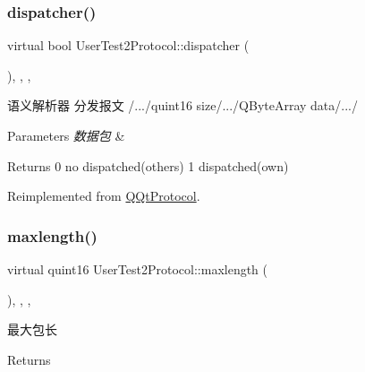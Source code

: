 \subsubsection{\texorpdfstring{dispatcher()}{dispatcher()}}
{\footnotesize\ttfamily virtual bool User\+Test2\+Protocol\+::dispatcher (\begin{DoxyParamCaption}\item[{const Q\+Byte\+Array \&}]{ }\end{DoxyParamCaption})\hspace{0.3cm}{\ttfamily [inline]}, {\ttfamily [override]}, {\ttfamily [protected]}, {\ttfamily [virtual]}}



语义解析器 分发报文 /.../quint16 size/.../\+Q\+Byte\+Array data/.../ 


\begin{DoxyParams}{Parameters}
{\em 数据包} & \\
\hline
\end{DoxyParams}
\begin{DoxyReturn}{Returns}
0 no dispatched(others) 1 dispatched(own) 
\end{DoxyReturn}


Reimplemented from \mbox{\hyperlink{class_q_qt_protocol_a35a69c4b89c8cf7459038f40d75e0dc9}{Q\+Qt\+Protocol}}.

\mbox{\label{class_user_test2_protocol_ace8c98d761f9660ad1d602c672e16705}} 
\subsubsection{\texorpdfstring{maxlength()}{maxlength()}}
{\footnotesize\ttfamily virtual quint16 User\+Test2\+Protocol\+::maxlength (\begin{DoxyParamCaption}{ }\end{DoxyParamCaption})\hspace{0.3cm}{\ttfamily [inline]}, {\ttfamily [override]}, {\ttfamily [protected]}, {\ttfamily [virtual]}}



最大包长 

\begin{DoxyReturn}{Returns}

\end{DoxyReturn}


